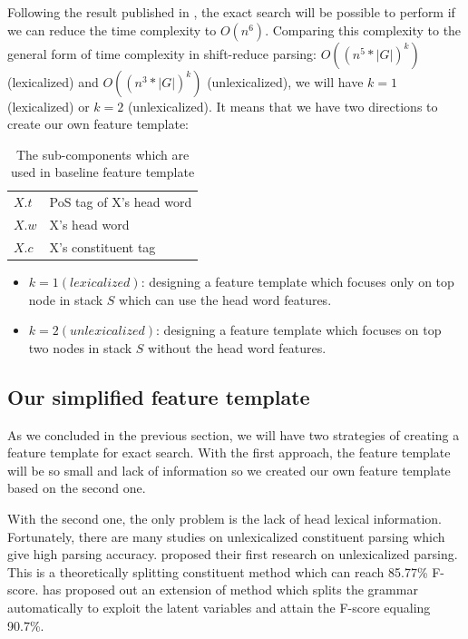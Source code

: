 Following the result published in \cite{ref:2013Zhao}, the exact search will be possible to perform if we can reduce the time complexity to $O(n^6)$. Comparing this complexity to the general form of time complexity in shift-reduce parsing: $O((n^5*|G|)^k)$ (lexicalized) and $O((n^3*|G|)^k)$ (unlexicalized), we will have $k=1$ (lexicalized) or $k=2$ (unlexicalized). It means that we have two directions to create our own feature template:

\begin{table}[h!]
	\caption{\label{baseline subcomp} The sub-components which are used in baseline feature template}
	\begin{center}
		\begin{tabular}{|l|l|}
			\hline 
			$X.t$ & PoS tag of X's head word \\
			$X.w$ & X's head word \\
			$X.c$ & X's constituent tag \\
			\hline
		\end{tabular}
	\end{center}
\end{table}

\begin{itemize}
	\item $k=1(lexicalized)$: designing a feature template which focuses only on top node in stack $S$ which can use the head word features.
	\item $k=2(unlexicalized)$: designing a feature template which focuses on top two nodes in stack $S$ without the head word features.
\end{itemize}

\subsection{Our simplified feature template}
As we concluded in the previous section, we will have two strategies of creating a feature template for exact search. With the first approach, the feature template will be so small and lack of information so we created our own feature template based on the second one. 

With the second one, the only problem is the lack of head lexical information. Fortunately, there are many studies on unlexicalized constituent parsing which give high parsing accuracy. \cite{ref:2003Dan2} proposed their first research on unlexicalized parsing. This is a theoretically splitting constituent method which can reach 85.77\% F-score. \cite{ref:2007petrov} has proposed out an extension of \cite{ref:2003Dan2} method which splits the grammar automatically to exploit the latent variables and attain the F-score equaling 90.7\%.

